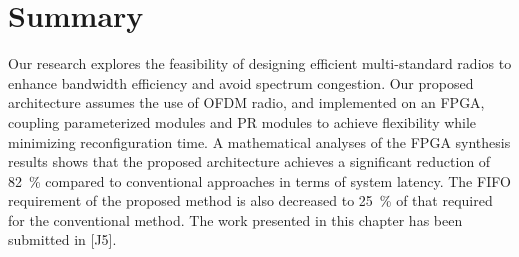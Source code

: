 \section{Summary}
Our research explores the feasibility of designing efficient multi-standard radios to enhance bandwidth efficiency and avoid spectrum congestion. 
Our proposed architecture assumes the use of OFDM radio, and implemented on an FPGA, coupling parameterized modules and PR modules to achieve flexibility while minimizing reconfiguration time.
A mathematical analyses of the FPGA synthesis results shows that the proposed architecture achieves a significant reduction of 82~\% compared to conventional approaches in terms of system latency. 
The FIFO requirement of the proposed method is also decreased to 25~\% of that required for the conventional method.
The work presented in this chapter has been submitted in [J5].